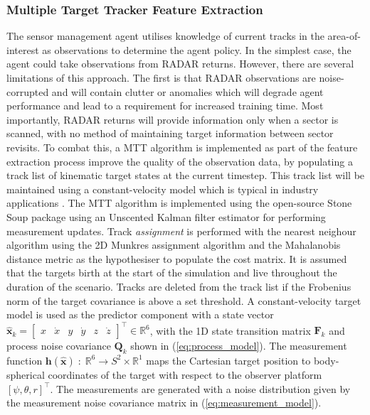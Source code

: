 \subsubsection{Multiple Target Tracker Feature Extraction}
The sensor management agent utilises knowledge of current tracks in the area-of-interest as observations to determine the agent policy. In the simplest case, the agent could take observations from RADAR returns. However, there are several limitations of this approach. The first is that RADAR observations are noise-corrupted and will contain clutter or anomalies which will degrade agent performance and lead to a requirement for increased training time. Most importantly, RADAR returns will provide information only when a sector is scanned, with no method of maintaining target information between sector revisits. To combat this, a MTT algorithm is implemented as part of the feature extraction process improve the quality of the observation data, by populating a track list of kinematic target states at the current timestep. This track list will be maintained using a constant-velocity model which is typical in industry applications \cite{li2003survey}. 
The MTT algorithm is implemented using the open-source Stone Soup package \cite{thomas2017open,barr2022stone} using an Unscented Kalman filter estimator \cite{julier2004unscented} for performing measurement updates. Track \textit{assignment} is performed with the nearest neighour algorithm using the 2D Munkres assignment algorithm and the Mahalanobis distance metric as the hypothesiser to populate the cost matrix. It is assumed that the targets birth at the start of the simulation and live throughout the duration of the scenario. Tracks are deleted from the track list if the Frobenius norm of the target covariance is above a set threshold. A constant-velocity target model is used as the predictor component with a state vector $\hat{\mathbf{x}}_{k}=\begin{bmatrix}x&\dot{x}&y&\dot{y}&z&\dot{z}\end{bmatrix}^{\top}\in\mathbb{R}^{6}$, with the 1D state transition matrix $\mathbf{F}_{k}$ and process noise covariance $\mathbf{Q}_{k}$ shown in (\ref{eq:process_model}). The measurement function $\boldsymbol{h}\left(\hat{\mathbf{x}}\right)\;:\;\mathbb{R}^{6}\rightarrow{}S^{2}\times{}\mathbb{R}^{1}$ maps the Cartesian target position to body-spherical coordinates of the target with respect to the observer platform $\left[\psi,\theta,r\right]^{\top}$. The measurements are generated with a noise distribution given by the measurement noise covariance matrix in (\ref{eq:measurement_model}).
